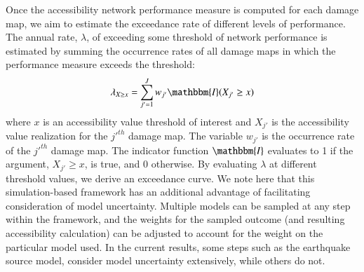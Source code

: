 
Once the accessibility network performance measure is computed for each damage map, we aim to estimate the exceedance rate of different levels of performance. The annual rate, $\lambda$, of exceeding some threshold of network performance is estimated by summing the occurrence rates of all damage maps in which the performance measure exceeds the threshold: 
\begin{equation}
\lambda_{X \geq x} = \sum_{j'=1}^{J} w_{j'} \mathbbm{I}(X_{j'}\geq x)
\label{eq:exceedance}
\end{equation}
where $x$ is an accessibility value threshold of interest and $X_{j'}$ is the accessibility value realization for the $j'^{th}$ damage map. The variable $w_{j'}$ is the occurrence rate of the $j'^{th}$ damage map. %
The indicator function $\mathbbm{I}$  evaluates to 1 if the argument, $X_{j'} \geq x$, is true, and 0 otherwise. By evaluating $\lambda$ at different threshold values, we derive an exceedance curve. 
We note here that this simulation-based framework has an additional advantage of facilitating consideration of model uncertainty. Multiple models can be sampled at any step within the framework, and the weights for the sampled outcome (and resulting accessibility calculation) can be adjusted to account for the weight on the particular model used. In the current results, some steps such as the earthquake source model, consider model uncertainty extensively, while others do not.

